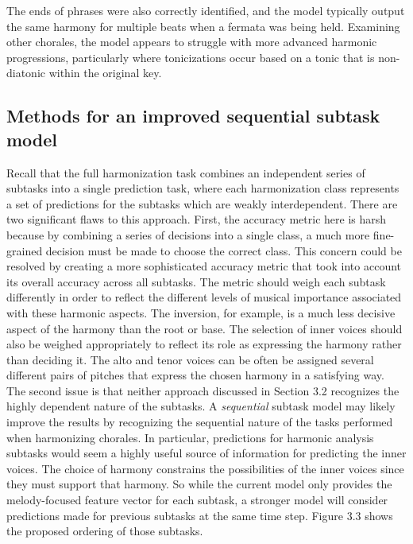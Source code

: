 \documentclass[11pt]{book}
\begin{document}
The ends of phrases were also correctly identified, and the model typically output the same harmony for multiple beats when a fermata was being held. Examining other chorales, the model appears to struggle with more advanced harmonic progressions, particularly where tonicizations occur based on a tonic that is non-diatonic within the original key.
\clearpage

\fancyhf{}
\fancyhead[R]{\thepage}

\fancyhf{}
\fancyhead[R]{\thepage}


\fancyhf{}
\fancyhead[R]{\thepage}

\subsection{Methods for an improved sequential subtask model}

Recall that the full harmonization task combines an independent series of subtasks into a single prediction task, where each harmonization class represents a set of predictions for the subtasks which are weakly interdependent. There are two significant flaws to this approach. First, the accuracy metric here is harsh because by combining a series of decisions into a single class, a much more fine-grained decision must be made to choose the correct class. This concern could be resolved by creating a more sophisticated accuracy metric that took into account its overall accuracy across all subtasks. The metric should weigh each subtask differently in order to reflect the different levels of musical importance associated with these harmonic aspects. The inversion, for example, is a much less decisive aspect of the harmony than the root or base. The selection of inner voices should also be weighed appropriately to reflect its role as expressing the harmony rather than deciding it. The alto and tenor voices can be often be assigned several different pairs of pitches that express the chosen harmony in a satisfying way. The second issue is that neither approach discussed in Section 3.2 recognizes the highly dependent nature of the subtasks. A \textit{sequential} subtask model may likely improve the results by recognizing the sequential nature of the tasks performed when harmonizing chorales. In particular, predictions for harmonic analysis subtasks would seem a highly useful source of information for predicting the inner voices. The choice of harmony constrains the possibilities of the inner voices since they must support that harmony. So while the current model only provides the melody-focused feature vector for each subtask, a stronger model will consider predictions made for previous subtasks at the same time step. Figure 3.3 shows the proposed ordering of those subtasks.
\end{document}
